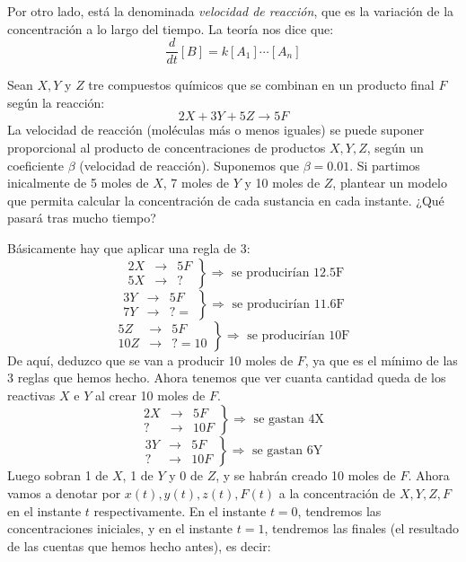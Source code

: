 Por otro lado, está la denominada \textit{velocidad de reacción}, que es la variación de la concentración a lo largo del tiempo. La teoría nos dice que:
\[
\frac{d}{dt}[B]=k[A_1]\cdots[A_n]
\]
\begin{example}
Sean $X,Y$ y $Z$ tre compuestos químicos que se combinan en un producto final $F$ según la reacción:
\[
2X+3Y+5Z\longrightarrow 5F
\]
La velocidad de reacción (moléculas más o menos iguales) se puede suponer proporcional al producto de concentraciones de productos $X,Y,Z$, según un coeficiente $\beta$ (velocidad de reacción). Suponemos que $\beta=0.01$. Si partimos inicalmente de 5 moles de $X$, 7 moles de $Y$ y 10 moles de $Z$, plantear un modelo que permita calcular la concentración de cada sustancia en cada instante. ¿Qué pasará tras mucho tiempo?

Básicamente hay que aplicar una regla de 3:
\[
\left.
\begin{array}{ccc}
2X & \longrightarrow & 5F\\
5X & \longrightarrow & ?
\end{array}
\right\} \Rightarrow \text{ se producirían  12.5F}
\]
\[
\left.
\begin{array}{ccc}
3Y & \longrightarrow & 5F\\
7Y & \longrightarrow & ? = 
\end{array}
\right\} \Rightarrow \text{ se producirían  11.6F }
\]
\[
\left.
\begin{array}{ccc}
5Z & \longrightarrow & 5F\\
10Z & \longrightarrow & ? = 10 
\end{array}
\right\} \Rightarrow \text{ se producirían  10F }
\]
De aquí, deduzco que se van a producir 10 moles de $F$, ya que es el mínimo de las 3 reglas que hemos hecho. Ahora tenemos que ver cuanta cantidad queda de los reactivas $X$ e $Y$ al crear 10 moles de $F$.
\[
\left.
\begin{array}{ccc}
2X & \longrightarrow & 5F\\
? & \longrightarrow & 10F
\end{array} 
\right\}
\Rightarrow \text{ se gastan 4X }
\]
\[
\left.
\begin{array}{ccc}
3Y & \longrightarrow & 5F\\
? & \longrightarrow & 10F
\end{array}
\right\} \Rightarrow \text{ se gastan 6Y }
\]
Luego sobran 1 de $X$, 1 de $Y$ y 0 de $Z$, y se habrán creado 10 moles de $F$. Ahora vamos a denotar por $x(t),y(t),z(t),F(t)$ a la concentración de $X,Y,Z,F$ en el instante $t$ respectivamente. En el instante $t=0$, tendremos las concentraciones iniciales, y en el instante $t=1$, tendremos las finales (el resultado de las cuentas que hemos hecho antes), es decir:

\end{example}
